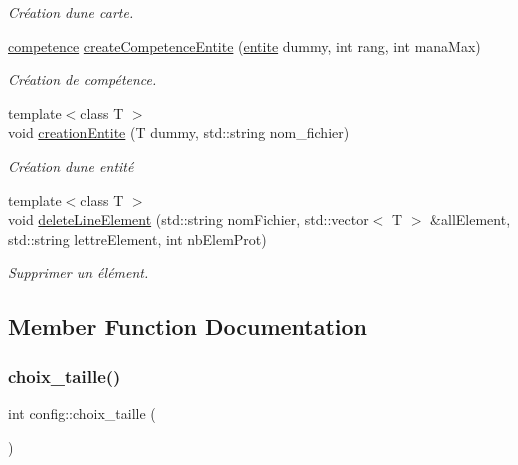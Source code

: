 \begin{DoxyCompactItemize}
\begin{DoxyCompactList}\small\item\em Création d\textquotesingle{}une carte. \end{DoxyCompactList}\item 
\hyperlink{classcompetence}{competence} \hyperlink{classconfig_a9311924c3fc7e8cef221c1fec32c832e}{create\+Competence\+Entite} (\hyperlink{classentite}{entite} dummy, int rang, int mana\+Max)
\begin{DoxyCompactList}\small\item\em Création de compétence. \end{DoxyCompactList}\item 
{\footnotesize template$<$class T $>$ }\\void \hyperlink{classconfig_a2df74fdb5ab353576bb8758259d8bc22}{creation\+Entite} (T dummy, std\+::string nom\+\_\+fichier)
\begin{DoxyCompactList}\small\item\em Création d\textquotesingle{}une entité \end{DoxyCompactList}\item 
{\footnotesize template$<$class T $>$ }\\void \hyperlink{classconfig_af343d1915cc536ae272c9fa3e321f4fc}{delete\+Line\+Element} (std\+::string nom\+Fichier, std\+::vector$<$ T $>$ \&all\+Element, std\+::string lettre\+Element, int nb\+Elem\+Prot)
\begin{DoxyCompactList}\small\item\em Supprimer un élément. \end{DoxyCompactList}\end{DoxyCompactItemize}


\subsection{Member Function Documentation}
\mbox{\label{classconfig_a4125b70dd7204927a1abf06342a934a9}} 
\subsubsection{\texorpdfstring{choix\+\_\+taille()}{choix\_taille()}}
{\footnotesize\ttfamily int config\+::choix\+\_\+taille (\begin{DoxyParamCaption}{ }\end{DoxyParamCaption})}



